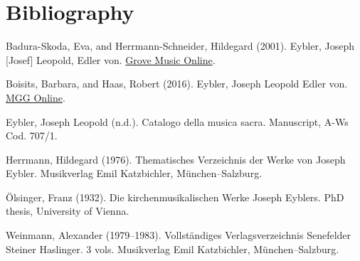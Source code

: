 \documentclass{ees}
\begin{document}
\section{Bibliography}

\begin{bulletlist}
  \item Badura-Skoda, Eva, and Herrmann-Schneider, Hildegard (2001). Eybler, Joseph [Josef] Leopold, Edler von. \href{https://doi.org/10.1093/gmo/9781561592630.article.40047}{Grove Music Online}.
  \item Boisits, Barbara, and Haas, Robert (2016). Eybler, Joseph Leopold Edler von. \href{https://www.mgg-online.com/mgg/stable/13179}{MGG Online}.
  \item Eybler, Joseph Leopold (n.d.). Catalogo della musica sacra. Manuscript, A-Ws Cod. 707/1.
  \item Herrmann, Hildegard (1976). Thematisches Verzeichnis der Werke von Joseph Eybler. Musikverlag Emil Katzbichler, München–Salzburg.
  \item Ölsinger, Franz (1932). Die kirchenmusikalischen Werke Joseph Eyblers. PhD thesis, University of Vienna.
  \item Weinmann, Alexander (1979–1983). Vollständiges Verlagsverzeichnis Senefelder Steiner Haslinger. 3 vols. Musikverlag Emil Katzbichler, München–Salzburg.
\end{bulletlist}
\end{document}
